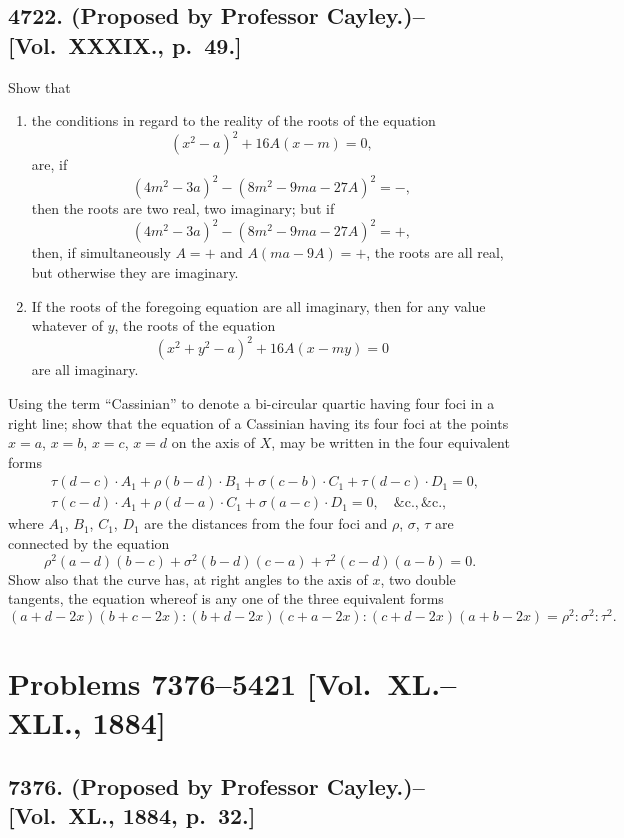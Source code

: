 \documentclass[11pt,a4paper]{book}
\begin{document}
\subsection*{4722. (Proposed by Professor Cayley.)\---[Vol.~XXXIX., p.~49.]}

Show that
\begin{enumerate}[label=\arabic*.]
\item the conditions in regard to the reality of the roots of the equation
\[
(x^2-a)^2 + 16A(x-m) = 0,
\]
are, if
\[
(4m^2-3a)^2 - (8m^2-9ma-27A)^2 = -,
\]
then the roots are two real, two imaginary; but if
\[
(4m^2-3a)^2 - (8m^2-9ma-27A)^2 = +,
\]
then, if simultaneously $A=+$ and $A(ma-9A)=+$, the roots are all real, but otherwise they are imaginary.

\item If the roots of the foregoing equation are all imaginary, then for any value whatever of $y$, the roots of the equation
\[
(x^2+y^2-a)^2 + 16A(x-my) = 0
\]
are all imaginary.
\end{enumerate}

Using the term ``Cassinian'' to denote a bi-circular quartic having four foci in a right line; show that the equation of a Cassinian having its four foci at the points $x=a$, $x=b$, $x=c$, $x=d$ on the axis of $X$, may be written in the four equivalent forms
\[
\begin{aligned}
&\tau(d-c)\cdot A_1 + \rho(b-d)\cdot B_1 + \sigma(c-b)\cdot C_1 + \tau(d-c)\cdot D_1 = 0, \\
&\tau(c-d)\cdot A_1 + \rho(d-a)\cdot C_1 + \sigma(a-c)\cdot D_1 = 0, \quad \&\text{c.}, \&\text{c.},
\end{aligned}
\]
where $A_1$, $B_1$, $C_1$, $D_1$ are the distances from the four foci and $\rho$, $\sigma$, $\tau$ are connected by the equation
\[
\rho^2(a-d)(b-c) + \sigma^2(b-d)(c-a) + \tau^2(c-d)(a-b) = 0.
\]
Show also that the curve has, at right angles to the axis of $x$, two double tangents, the equation whereof is any one of the three equivalent forms
\[
(a+d-2x)(b+c-2x) : (b+d-2x)(c+a-2x) : (c+d-2x)(a+b-2x) = \rho^2 : \sigma^2 : \tau^2.
\]

\newpage

\section*{Problems 7376--5421 [Vol.~XL.--XLI., 1884]}

\subsection*{7376. (Proposed by Professor Cayley.)\---[Vol.~XL., 1884, p.~32.]}
\end{document}
